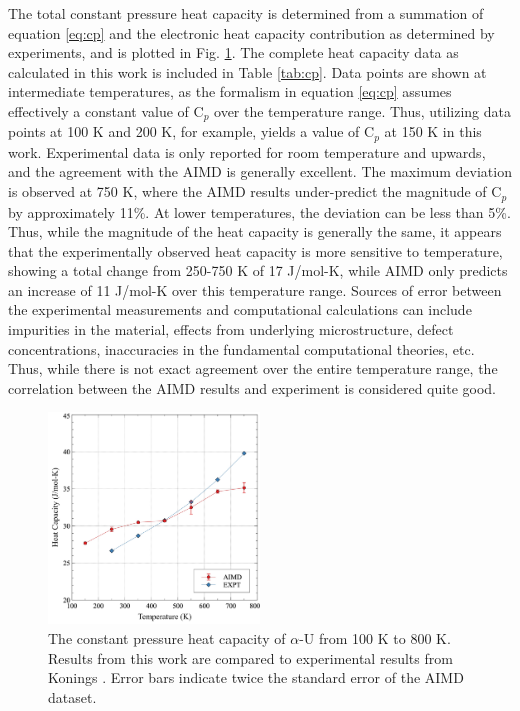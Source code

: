 \documentclass[utf8]{frontiersSCNS} %
\begin{document}
The total constant pressure heat capacity is determined from a summation of equation \ref{eq:cp} and the electronic heat capacity contribution as determined by experiments, and is plotted in Fig. \ref{fig:cp}. The complete heat capacity data as calculated in this work is included in Table \ref{tab:cp}. Data points are shown at intermediate temperatures, as the formalism in equation \ref{eq:cp} assumes effectively a constant value of C$_p$ over the temperature range. Thus, utilizing data points at 100 K and 200 K, for example, yields a value of C$_p$ at 150 K in this work. Experimental data is only reported for room temperature and upwards, and the agreement with the AIMD is generally excellent. The maximum deviation is observed at 750 K, where the AIMD results under-predict the magnitude of C$_p$ by approximately 11\%. At lower temperatures, the deviation can be less than 5\%. Thus, while the magnitude of the heat capacity is generally the same, it appears that the experimentally observed heat capacity is more sensitive to temperature, showing a total change from 250-750 K of 17 J/mol-K, while AIMD only predicts an increase of 11 J/mol-K over this temperature range. Sources of error between the experimental measurements and computational calculations can include impurities in the material, effects from underlying microstructure, defect concentrations, inaccuracies in the fundamental computational theories, etc. Thus, while there is not exact agreement over the entire temperature range, the correlation between the AIMD results and experiment is considered quite good. 

 \begin{figure}[hbt]
	\centering
	\includegraphics[width=0.5\textwidth]{cp.jpg}
  \caption{The constant pressure heat capacity of $\alpha$-U from 100 K to 800 K. Results from this work are compared to experimental results from Konings \cite{konings2010}. Error bars indicate twice the standard error of the AIMD dataset.}\label{fig:cp}
\end{figure}
\end{document}
